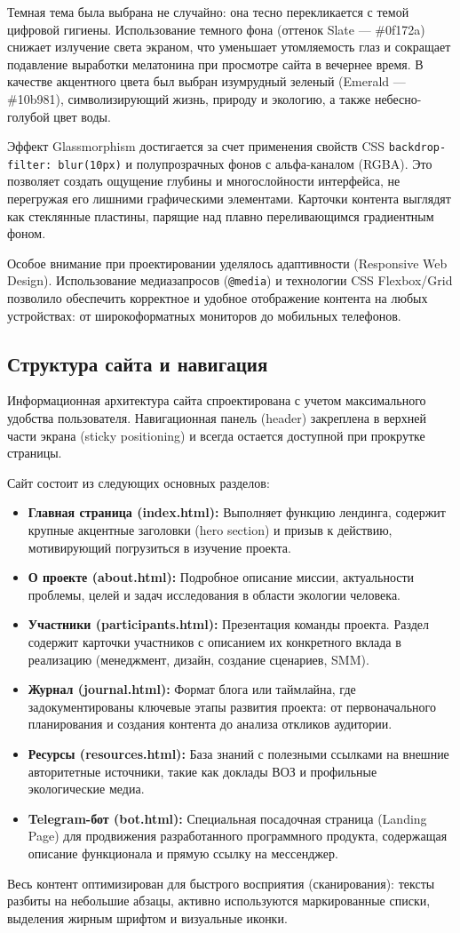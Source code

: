 Темная тема была выбрана не случайно: она тесно перекликается с темой цифровой гигиены. Использование темного фона (оттенок Slate — \#0f172a) снижает излучение света экраном, что уменьшает утомляемость глаз и сокращает подавление выработки мелатонина при просмотре сайта в вечернее время. В качестве акцентного цвета был выбран изумрудный зеленый (Emerald — \#10b981), символизирующий жизнь, природу и экологию, а также небесно-голубой цвет воды.

Эффект Glassmorphism достигается за счет применения свойств CSS \texttt{backdrop-filter: blur(10px)} и полупрозрачных фонов с альфа-каналом (RGBA). Это позволяет создать ощущение глубины и многослойности интерфейса, не перегружая его лишними графическими элементами. Карточки контента выглядят как стеклянные пластины, парящие над плавно переливающимся градиентным фоном.

Особое внимание при проектировании уделялось адаптивности (Responsive Web Design). Использование медиазапросов (\texttt{@media}) и технологии CSS Flexbox/Grid позволило обеспечить корректное и удобное отображение контента на любых устройствах: от широкоформатных мониторов до мобильных телефонов.

\subsection{Структура сайта и навигация}
Информационная архитектура сайта спроектирована с учетом максимального удобства пользователя. Навигационная панель (header) закреплена в верхней части экрана (sticky positioning) и всегда остается доступной при прокрутке страницы.

Сайт состоит из следующих основных разделов:
\begin{itemize}
    \item \textbf{Главная страница (index.html):} Выполняет функцию лендинга, содержит крупные акцентные заголовки (hero section) и призыв к действию, мотивирующий погрузиться в изучение проекта.
    \item \textbf{О проекте (about.html):} Подробное описание миссии, актуальности проблемы, целей и задач исследования в области экологии человека.
    \item \textbf{Участники (participants.html):} Презентация команды проекта. Раздел содержит карточки участников с описанием их конкретного вклада в реализацию (менеджмент, дизайн, создание сценариев, SMM).
    \item \textbf{Журнал (journal.html):} Формат блога или таймлайна, где задокументированы ключевые этапы развития проекта: от первоначального планирования и создания контента до анализа откликов аудитории.
    \item \textbf{Ресурсы (resources.html):} База знаний с полезными ссылками на внешние авторитетные источники, такие как доклады ВОЗ и профильные экологические медиа.
    \item \textbf{Telegram-бот (bot.html):} Специальная посадочная страница (Landing Page) для продвижения разработанного программного продукта, содержащая описание функционала и прямую ссылку на мессенджер.
\end{itemize}

Весь контент оптимизирован для быстрого восприятия (сканирования): тексты разбиты на небольшие абзацы, активно используются маркированные списки, выделения жирным шрифтом и визуальные иконки.
